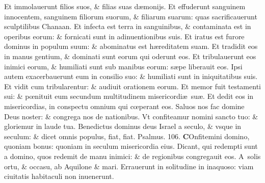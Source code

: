 \documentclass[a5paper,10pt]{book}
\def\ae{æ}
\def\oe{œ}
\begin{document}
\begin{multicols*}{2}
\newline \color{red} E\color{black}t immolauerunt filios suos, \& filias suas d\ae monijs.
\newline \color{red} E\color{black}t effuderunt sanguinem innocentem, sanguinem filiorum suorum, \& filiarum suarum: quas sacrificauerunt sculptilibus Chanaan.
\newline \color{red} E\color{black}t infecta est terra in sanguinibus, \& contaminata est in operibus eorum: \& fornicati sunt in adinuentionibus suis.
\newline \color{red} E\color{black}t iratus est furore dominus in populum suum: \& abominatus est h\ae reditatem suam.
\newline \color{red} E\color{black}t tradidit eos in manus gentium, \& dominati sunt eorum qui oderunt eos.
\newline \color{red} E\color{black}t tribulauerunt eos inimici eorum, \& humiliati sunt sub manibus eorum: s\ae pe liberauit eos.
\newline \color{red} I\color{black}psi autem exacerbauerunt eum in consilio suo: \& humiliati sunt in iniquitatibus suis.
\newline \color{red} E\color{black}t vidit cum tribularentur: \& audiuit orationem eorum.
\newline \color{red} E\color{black}t memor fuit testamenti sui: \& p\oe nituit eum secundum multitudinem misericordi\ae \ su\ae .
\newline \color{red} E\color{black}t dedit eos in misericordias, in conspectu omnium qui c\oe perant eos.
\newline \color{red} S\color{black}aluos nos fac domine Deus noster: \& congrega nos de nationibus.
\newline \color{red} V\color{black}t confiteamur nomini sancto tuo: \& gloriemur in laude tua.
\newline \color{red} B\color{black}enedictus dominus deus Israel a seculo, \& vsque in seculum: \& dicet omnis populus, fiat, fiat. \color{red} Psalmus. \hypertarget{ps106}{106.} \color{black}
\vspace{-1.5em}
\lettrine[lines=2]{\bfseries \color{red} C}{}Onfitemini domino, quoniam bonus: quoniam in seculum misericordia eius.
\newline \color{red} D\color{black}icant, qui redempti sunt a domino, quos redemit de manu inimici: \& de regionibus congregauit eos.
\newline \color{red} A\color{black}\ solis ortu, \& occasu, ab Aquilone \& mari.
\newline \color{red} E\color{black}rrauerunt in solitudine in inaquoso: viam ciuitatis habitaculi non inuenerunt.

\end{multicols*}
\end{document}
